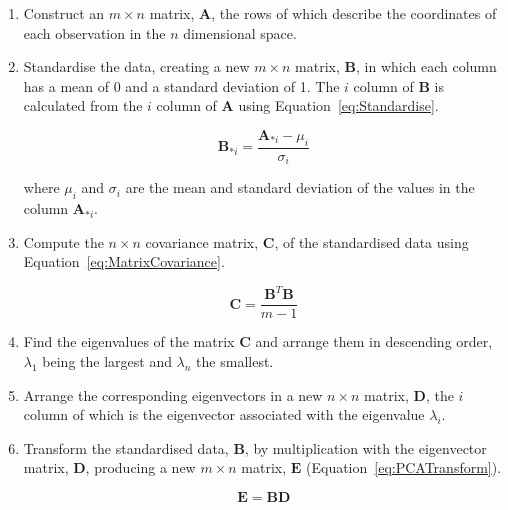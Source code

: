 		\begin{enumerate}
			\item Construct an $m \times n$ matrix, $\mathbf{A}$, the rows of which describe the coordinates of
				each observation in the $n$ dimensional space.
				
			\item Standardise the data, creating a new $m \times n$ matrix, $\mathbf{B}$, in which each column
				has a mean of 0 and a standard deviation of 1. The $i$ column of $\mathbf{B}$ is
				calculated from the $i$ column of $\mathbf{A}$ using
				Equation~\ref{eq:Standardise}.

				\begin{equation}
					\mathbf{B}_{*i} = \frac{\mathbf{A}_{*i} - \mu_{i}}{\sigma_{i}}
					\label{eq:Standardise}
				\end{equation}

				where $\mu_{i}$ and $\sigma_{i}$ are the mean and standard deviation of the values in the
				column $\mathbf{A}_{*i}$.

			\item Compute the $n \times n$ covariance matrix, $\mathbf{C}$, of the standardised data using
				Equation~\ref{eq:MatrixCovariance}.

				\begin{equation}
					\mathbf{C} = \frac{\mathbf{B}^{T}\mathbf{B}}{m - 1}
					\label{eq:MatrixCovariance}
				\end{equation}

			\item \label{enum:Eigen} Find the eigenvalues of the matrix $\mathbf{C}$ and arrange them in
				descending order, $\lambda_{1}$ being the largest and $\lambda_{n}$ the smallest.  \item
				Arrange the corresponding eigenvectors in a new $n \times n$ matrix, $\mathbf{D}$, the
				$i$ column of which is the eigenvector associated with the eigenvalue
				$\lambda_{i}$.

			\item Transform the standardised data, $\mathbf{B}$, by multiplication with the eigenvector matrix,
				$\mathbf{D}$, producing a new $m \times n$ matrix, $\mathbf{E}$
				(Equation~\ref{eq:PCATransform}).

				\begin{equation}
					\mathbf{E} = \mathbf{BD}
					\label{eq:PCATransform}
				\end{equation}

		\end{enumerate}

